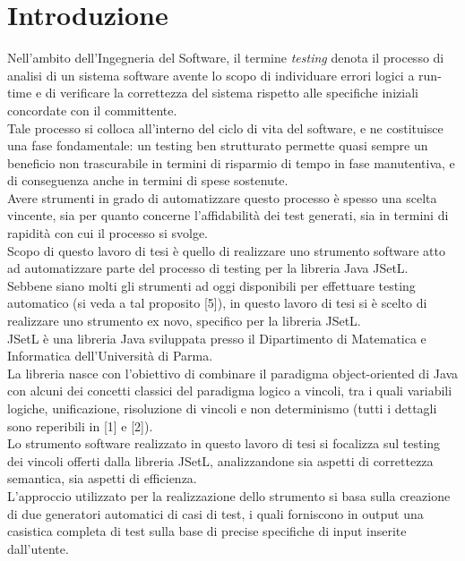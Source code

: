 
\section{Introduzione}

Nell'ambito dell'Ingegneria del Software, il termine \emph{testing} denota il processo di analisi di un sistema software avente lo scopo di individuare errori logici a run-time e di verificare la correttezza del sistema rispetto alle specifiche iniziali concordate con il committente.\\
Tale processo si colloca all'interno del ciclo di vita del software, e ne costituisce una fase fondamentale: un testing ben strutturato permette quasi sempre un beneficio non trascurabile in termini di risparmio di tempo in fase manutentiva, e di conseguenza anche in termini di spese sostenute.\\
Avere strumenti in grado di automatizzare questo processo è spesso una scelta vincente, sia per quanto concerne l'affidabilità dei test generati, sia in termini di rapidità con cui il processo si svolge.\\
Scopo di questo lavoro di tesi è quello di realizzare uno strumento software atto ad automatizzare parte del processo di testing per la libreria Java JSetL.\\
Sebbene siano molti gli strumenti ad oggi disponibili per effettuare testing automatico (si veda a tal proposito [5]), in questo lavoro di tesi si è scelto di realizzare uno strumento ex novo, specifico per la libreria JSetL.\\

JSetL è una libreria Java sviluppata presso il Dipartimento di Matematica e Informatica dell’Università di Parma.\\
La libreria nasce con l'obiettivo di combinare il paradigma object-oriented di Java con alcuni dei concetti classici del paradigma logico a vincoli, tra i quali variabili logiche, unificazione, risoluzione di vincoli e non determinismo (tutti i dettagli sono reperibili in [1] e [2]).\\
Lo strumento software realizzato in questo lavoro di tesi si focalizza sul testing dei vincoli offerti dalla libreria JSetL, analizzandone sia aspetti di correttezza semantica, sia aspetti di efficienza.\\
L'approccio utilizzato per la realizzazione dello strumento si basa sulla creazione di due generatori automatici di casi di test, i quali forniscono in output una casistica completa di test sulla base di precise specifiche di input inserite dall'utente.
\clearpage

